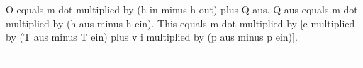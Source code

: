 O equals m dot multiplied by (h in minus h out) plus Q aus.  
Q aus equals m dot multiplied by (h aus minus h ein).  
This equals m dot multiplied by [c multiplied by (T aus minus T ein) plus v i multiplied by (p aus minus p ein)].

---